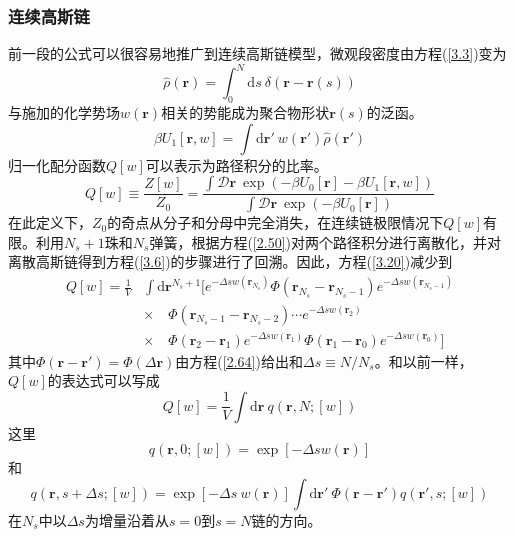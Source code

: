 \subsubsection{连续高斯链}
前一段的公式可以很容易地推广到连续高斯链模型，微观段密度由方程(\ref{3.3})变为
\begin{equation}\label{3.18}
\hat{\rho}(\mathbf{r})=\int_0^N\mathrm{d}s~\delta(\mathbf{r}-\mathbf{r}(s))
\end{equation}
与施加的化学势场$w(\mathbf{r})$相关的势能成为聚合物形状$\mathbf{r}(s)$的泛函。
\begin{equation}\label{3.19}
\beta U_1[\mathbf{r},w]=\int\mathrm{d}\mathbf{r}'~w(\mathbf{r}')\hat{\rho}(\mathbf{r}')
\end{equation}
归一化配分函数$Q[w]$可以表示为路径积分的比率。
\begin{equation}\label{3.19}
Q[w]\equiv\frac{Z[w]}{Z_0}=\frac{\int\mathcal{D}\mathbf{r}~\exp(-\beta U_0[\mathbf{r}]-\beta U_1[\mathbf{r},w])}{\int\mathcal{D}\mathbf{r}~\exp(-\beta U_0[\mathbf{r}])}
\end{equation}
在此定义下，$Z_0$的奇点从分子和分母中完全消失，在连续链极限情况下$Q[w]$有限。利用$N_s+1$珠和$N_s$弹簧，根据方程(\ref{2.50})对两个路径积分进行离散化，并对离散高斯链得到方程(\ref{3.6})的步骤进行了回溯。因此，方程(\ref{3.20})减少到
\begin{equation}\label{3.21}
\begin{aligned}
Q[w]=\frac{1}{V}&\int\mathrm{d}\mathbf{r}^{N_s+1}[e^{-\Delta sw(\mathbf{r}_{N_s})}\Phi(\mathbf{r}_{N_s}-\mathbf{r}_{N_s-1})e^{-\Delta sw(\mathbf{r}_{N_s-1})}\\
&\times\quad\Phi(\mathbf{r}_{N_s-1}-\mathbf{r}_{N_s-2})\cdots e^{-\Delta sw(\mathbf{r}_2)}\\
&\times\quad\Phi(\mathbf{r}_2-\mathbf{r}_1)e^{-\Delta sw(\mathbf{r}_1)}\Phi(\mathbf{r}_1-\mathbf{r}_0)e^{-\Delta sw(\mathbf{r}_0)}]
\end{aligned}
\end{equation}
其中$\Phi(\mathbf{r}-\mathbf{r}')=\Phi(\Delta\mathbf{r})$由方程(\ref{2.64})给出和$\Delta s\equiv N/N_s$。和以前一样，$Q[w]$的表达式可以写成
\begin{equation}\label{3.22}
Q[w]=\frac{1}{V}\int\mathrm{d}\mathbf{r}~q(\mathbf{r},N;[w])
\end{equation}
这里
\begin{equation}\label{3.23}
q(\mathbf{r},0;[w])=\exp[-\Delta sw(\mathbf{r})]
\end{equation}
和
\begin{equation}\label{3.24}
q(\mathbf{r},s+\Delta s;[w])=\exp[-\Delta s~w(\mathbf{r})]\int\mathrm{d}\mathbf{r}'~\Phi(\mathbf{r}-\mathbf{r}')q(\mathbf{r}',s;[w])
\end{equation}
在$N_s$中以$\Delta s$为增量沿着从$s=0$到$s=N$链的方向。

